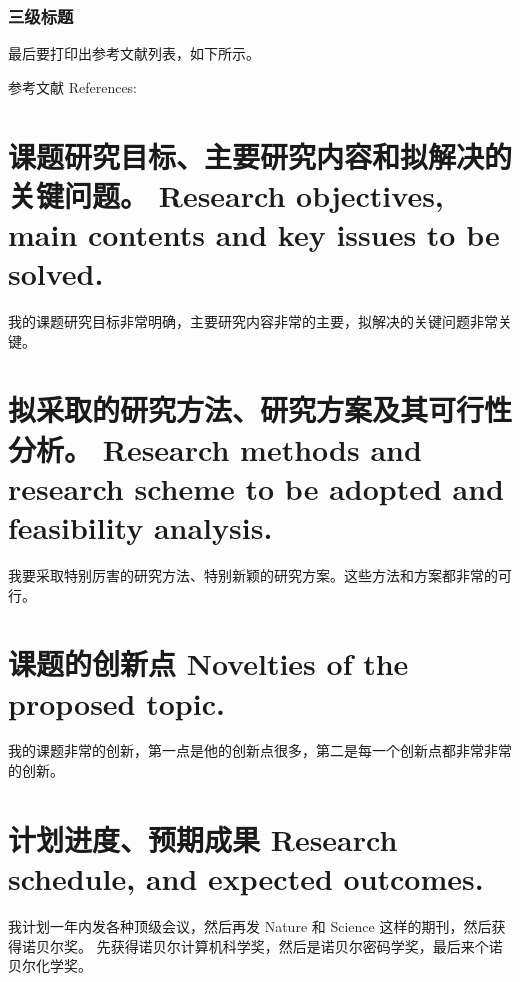 \documentclass[a4paper,zihao=-4,AutoFakeBold]{ctexart}
\begin{document}
\subsubsection{三级标题}\label{subsub}

最后要打印出参考文献列表，如下所示。


\vspace{2\baselineskip}%
{%
    \linespread{1.25}\selectfont    %
    参考文献 References: 
    \printbibliography[heading=none]
}


\section{课题研究目标、主要研究内容和拟解决的关键问题。 
    Research objectives, main contents and key issues to be solved.}

我的课题研究目标非常明确，主要研究内容非常的主要，拟解决的关键问题非常关键。



\section{拟采取的研究方法、研究方案及其可行性分析。
    Research methods and research scheme to be adopted 
    and feasibility analysis.}

我要采取特别厉害的研究方法、特别新颖的研究方案。这些方法和方案都非常的可行。



\section{课题的创新点 Novelties of the proposed topic.}

我的课题非常的创新，第一点是他的创新点很多，第二是每一个创新点都非常非常的创新。



\section{计划进度、预期成果 Research schedule, and expected outcomes.}

我计划一年内发各种顶级会议，然后再发 Nature 和 Science 这样的期刊，然后获得诺贝尔奖。
先获得诺贝尔计算机科学奖，然后是诺贝尔密码学奖，最后来个诺贝尔化学奖。
\end{document}
